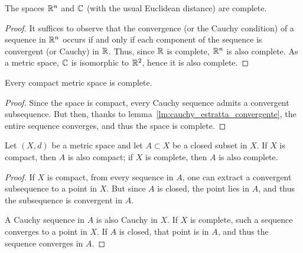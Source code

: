 \begin{corollary}
The spaces ${\mathbb R}^n$ and ${\mathbb C}$ (with the usual Euclidean distance)
are complete.
\end{corollary}
%
\begin{proof}
It suffices to observe that the convergence (or the Cauchy condition) of a
sequence in ${\mathbb R}^n$
occurs if and only if each component of the sequence is convergent (or Cauchy)
in ${\mathbb R}$.
Thus, since ${\mathbb R}$ is complete, ${\mathbb R}^n$ is also complete. 
As a metric space, ${\mathbb C}$ is isomorphic to ${\mathbb R}^2$, hence it is also complete.
\end{proof}

\begin{theorem}
Every compact metric space is complete.
\end{theorem}
%
\begin{proof}
Since the space is compact, every Cauchy sequence
admits a convergent subsequence.
But then, thanks to lemma~\ref{lm:cauchy_estratta_convergente},
the entire sequence converges, and thus the space is complete.
\end{proof}

\begin{theorem}%
\label{th:chiuso_completo}%
\label{th:compatto_completo}%
Let $(X,d)$ be a metric space and let $A\subset X$ be a closed subset in $X$. If
$X$ is compact, then $A$ is also compact; if $X$ is complete, then $A$ is also
complete.
\end{theorem}
\begin{proof}
If $X$ is compact, from every sequence in $A$, one can extract a convergent
subsequence to a point in $X$.
But since $A$ is closed, the point lies in $A$, and thus the subsequence is
convergent in $A$.

A Cauchy sequence in $A$ is also Cauchy in $X$. 
If $X$ is complete, such a sequence converges to a point in $X$. 
If $A$ is closed, that point is in $A$, and thus the sequence converges in $A$.
\end{proof}

